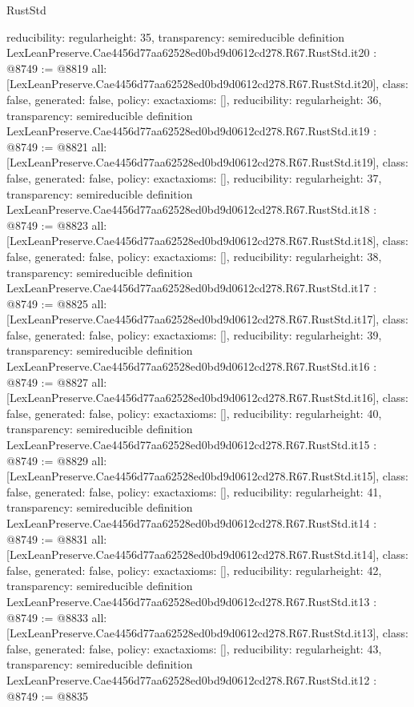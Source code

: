 \begin{lexlean}{RustStd}
\begin{coremodule}
{  reducibility: regular{height: 35},
  transparency: semireducible
}
definition LexLeanPreserve.Cae4456d77aa62528ed0bd9d0612cd278.R67.RustStd.it20 : @8749 := @8819 {
  all: [LexLeanPreserve.Cae4456d77aa62528ed0bd9d0612cd278.R67.RustStd.it20],
  class: false,
  generated: false,
  policy: exact{axioms: []},
  reducibility: regular{height: 36},
  transparency: semireducible
}
definition LexLeanPreserve.Cae4456d77aa62528ed0bd9d0612cd278.R67.RustStd.it19 : @8749 := @8821 {
  all: [LexLeanPreserve.Cae4456d77aa62528ed0bd9d0612cd278.R67.RustStd.it19],
  class: false,
  generated: false,
  policy: exact{axioms: []},
  reducibility: regular{height: 37},
  transparency: semireducible
}
definition LexLeanPreserve.Cae4456d77aa62528ed0bd9d0612cd278.R67.RustStd.it18 : @8749 := @8823 {
  all: [LexLeanPreserve.Cae4456d77aa62528ed0bd9d0612cd278.R67.RustStd.it18],
  class: false,
  generated: false,
  policy: exact{axioms: []},
  reducibility: regular{height: 38},
  transparency: semireducible
}
definition LexLeanPreserve.Cae4456d77aa62528ed0bd9d0612cd278.R67.RustStd.it17 : @8749 := @8825 {
  all: [LexLeanPreserve.Cae4456d77aa62528ed0bd9d0612cd278.R67.RustStd.it17],
  class: false,
  generated: false,
  policy: exact{axioms: []},
  reducibility: regular{height: 39},
  transparency: semireducible
}
definition LexLeanPreserve.Cae4456d77aa62528ed0bd9d0612cd278.R67.RustStd.it16 : @8749 := @8827 {
  all: [LexLeanPreserve.Cae4456d77aa62528ed0bd9d0612cd278.R67.RustStd.it16],
  class: false,
  generated: false,
  policy: exact{axioms: []},
  reducibility: regular{height: 40},
  transparency: semireducible
}
definition LexLeanPreserve.Cae4456d77aa62528ed0bd9d0612cd278.R67.RustStd.it15 : @8749 := @8829 {
  all: [LexLeanPreserve.Cae4456d77aa62528ed0bd9d0612cd278.R67.RustStd.it15],
  class: false,
  generated: false,
  policy: exact{axioms: []},
  reducibility: regular{height: 41},
  transparency: semireducible
}
definition LexLeanPreserve.Cae4456d77aa62528ed0bd9d0612cd278.R67.RustStd.it14 : @8749 := @8831 {
  all: [LexLeanPreserve.Cae4456d77aa62528ed0bd9d0612cd278.R67.RustStd.it14],
  class: false,
  generated: false,
  policy: exact{axioms: []},
  reducibility: regular{height: 42},
  transparency: semireducible
}
definition LexLeanPreserve.Cae4456d77aa62528ed0bd9d0612cd278.R67.RustStd.it13 : @8749 := @8833 {
  all: [LexLeanPreserve.Cae4456d77aa62528ed0bd9d0612cd278.R67.RustStd.it13],
  class: false,
  generated: false,
  policy: exact{axioms: []},
  reducibility: regular{height: 43},
  transparency: semireducible
}
definition LexLeanPreserve.Cae4456d77aa62528ed0bd9d0612cd278.R67.RustStd.it12 : @8749 := @8835 {
}
\end{coremodule}
\end{lexlean}

